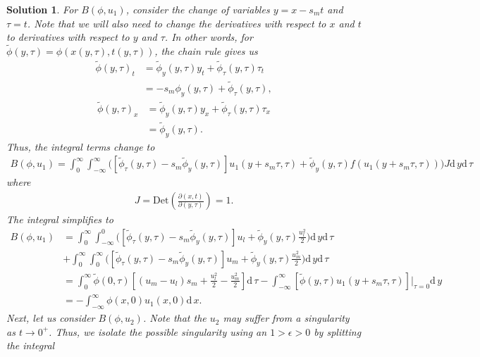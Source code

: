 \documentclass[10pt,letterpaper]{article}
\newcommand{\dif}[1][]{\mathrm{d} {#1}\,}
\newcommand{\frb}[1]{ \left(  {#1} \right) }
\theoremstyle{break}
\newtheorem{mysolution}{Solution}
\newtheorem*{mysolutioninformation}{Solution Information}
\newenvironment{solution}{\begin{mysolution}}{\end{mysolution}} \newenvironment{solutioninformation}{\begin{mysolutioninformation}}{\end{mysolutioninformation}}
\begin{document}
\begin{solution}
	For $B\frb{\phi,u_1}$, consider the change of variables $y = x - s_mt$ and $\tau = t$. Note that we will also need to change the derivatives with respect to $x$ and $t$ to derivatives with respect to $y$ and $\tau$. In other words, for $\widetilde \phi(y,\tau) = \phi(x(y,\tau),t(y,\tau))$, the chain rule gives us
	\begin{align*}
		\widetilde \phi(y,\tau)_t &=\widetilde \phi_y(y,\tau) y_t + \widetilde \phi_\tau(y,\tau) \tau_t\\
		&=
		-s_m \phi_y(y,\tau) + \widetilde \phi_\tau(y,\tau),
	\end{align*}
	\begin{align*}
		\widetilde \phi(y,\tau)_x &=\widetilde \phi_y(y,\tau) y_x + \widetilde \phi_\tau(y,\tau) \tau_x\\
		&= \widetilde \phi_y(y,\tau).
	\end{align*}
	Thus, the integral terms change to
	\begin{gather}
		B\frb{\phi,u_1}=\int_0^\infty \int_{-\infty}^\infty
				\Big( \left[ \widetilde \phi_\tau(y,\tau) -s_m \widetilde \phi_y(y,\tau)\right] u_1\frb{y+s_m \tau, \tau} + \widetilde \phi_y(y,\tau)  f(u_1\frb{y+s_m \tau, \tau}) \Big)
			J \dif y\dif \tau\ 
	\end{gather}
	where
	\begin{gather}
		J = \text{Det} \left( \frac{\partial(x,t)}{\partial(y,\tau)} \right) = 1.
	\end{gather}
	The integral simplifies to
	\begin{align} \label{Bsum1}
		B\frb{\phi,u_1}&=\int_0^\infty \int_{-\infty}^0
				\Big( \left[ \widetilde \phi_\tau(y,\tau) -s_m \widetilde \phi_y(y,\tau)\right] u_l + \widetilde \phi_y(y,\tau)  \frac{u_l^2}{2} \Big)
			 \dif y\dif \tau\  \\
			 & + \int_0^\infty \int_0^{\infty}
				\Big( \left[ \widetilde \phi_\tau(y,\tau) -s_m  \widetilde\phi_y(y,\tau)\right] u_m + \widetilde \phi_y(y,\tau)  \frac{u_m^2}{2} \Big)
			 \dif y\dif \tau\ \\
			 &= \int_0^\infty \widetilde \phi(0,\tau) \left[(u_m - u_l) s_m + \frac{u_l^2}{2} - \frac{u_m^2}{2} \right] \dif \tau - \int_{-\infty}^{\infty} \left[\widetilde \phi(y,\tau) u_1(y+s_m \tau,\tau) \right]\Big|_{\tau=0} \dif y\\
			 &= - \int_{-\infty}^{\infty} \phi(x,0) u_1(x,0) \dif x.
	\end{align}
	Next, let us consider $B\frb{\phi,u_2}$. Note that the $u_2$ may suffer from a singularity as $t \rightarrow 0^+$. Thus, we isolate the possible singularity using an $1>\epsilon > 0$ by splitting the integral

\end{solution}
\end{document}
